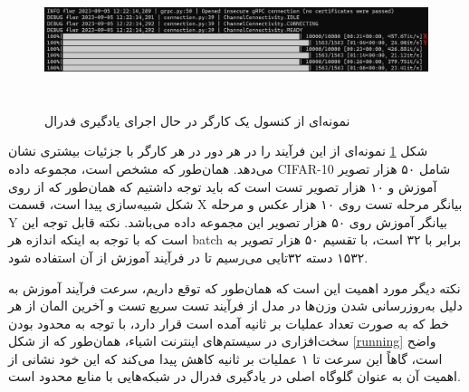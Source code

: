 \begin{figure}[H]
    \centering
   \includegraphics[height=4cm,width=16cm]{./simulations/client.png}
   \caption{ نمونه‌ای از کنسول یک کارگر در حال اجرای یادگیری فدرال}
   \label{client}
   \centering
\end{figure}


شکل \ref{client} نمونه‌ای از این فرآیند را در هر دور در هر کارگر با جزئیات بیشتری نشان می‌دهد. همان‌طور که مشخص است، مجموعه داده‌ CIFAR-10 شامل ۵۰ هزار تصویر آموزش و ۱۰ هزار تصویر تست است که باید توجه داشتیم که همان‌طور که از روی شکل شبیه‌سازی پیدا است، قسمت X بیانگر مرحله تست روی ۱۰ هزار عکس و مرحله Y بیانگر آموزش روی ۵۰ هزار تصویر این مجموعه داده می‌باشد. نکته قابل توجه این است که با توجه به اینکه اندازه هر batch برابر با ۳۲ است، با تقسیم ۵۰ هزار تصویر به ۱۵۳۲ دسته ۳۲تایی می‌رسیم تا در فرآیند آموزش از آن استفاده شود.

نکته دیگر مورد اهمیت این است که همان‌طور که توقع داریم، سرعت فرآیند آموزش به دلیل به‌روزرسانی شدن وزن‌ها در مدل از  فرآیند تست سریع تست و آخرین المان از هر خط  که به صورت تعداد عملیات بر ثانیه آمده است قرار دارد، با توجه به محدود بودن سخت‌افزاری در سیستم‌های اینترنت اشیاء، همان‌طور که از شکل \ref{running} واضح است، گاهاً این سرعت تا ۱ عملیات بر ثانیه کاهش پیدا می‌کند که این خود نشانی از اهمیت آن به عنوان گلوگاه اصلی در یادگیری فدرال در شبکه‌هایی با منابع محدود است.



